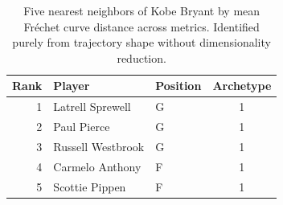 \begin{table}[htbp]
  \centering\small
  \begin{tabular}{rllc}
    \toprule
    Rank & Player & Position & Archetype \\
    \midrule
    1 & Latrell Sprewell & G & 1 \\
    2 & Paul Pierce & G & 1 \\
    3 & Russell Westbrook & G & 1 \\
    4 & Carmelo Anthony & F & 1 \\
    5 & Scottie Pippen & F & 1 \\
    \bottomrule
  \end{tabular}
  \caption{Five nearest neighbors of Kobe Bryant by mean Fr\'{e}chet curve distance across metrics. Identified purely from trajectory shape without dimensionality reduction.}
  \label{tab:Kobe_Bryant_frechet_curve_neighbors}
\end{table}

